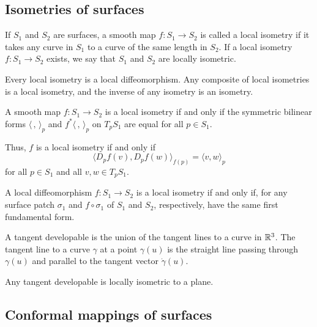 \subsection{Isometries of surfaces}

\begin{defn}
  If $S_1$ and $S_2$ are surfaces, a smooth map $f: S_1 \to S_2$ is called
  a local isometry if it takes any curve in $S_1$ to a curve of the same
  length in $S_2$.
  If a local isometry $f: S_1 \to S_2$ exists,
  we say that $S_1$ and $S_2$ are locally isometric.
\end{defn}

\begin{remark}
  Every local isometry is a local diffeomorphism.
  Any composite of local isometries is a local isometry, and
  the inverse of any isometry is an isometry.
\end{remark}

\begin{theorem}
  A smooth map $f: S_1 \to S_2$ is a local isometry if and only if
  the symmetric bilinear forms $\langle\,,\,\rangle_p$ and
  $f^*\langle\,,\,\rangle_p$ on $T_p S_1$ are equal for all $p \in S_1$.
\end{theorem}

Thus, $f$ is a local isometry if and only if
\[
  \langle D_p f(v), D_p f(w) \rangle_{f(p)} =
  \langle v, w \rangle_p
\]
for all $p \in S_1$ and all $v, w \in T_p S_1$.

\begin{corollary}
  A local diffeomorphism $f: S_1 \to S_2$ is a local isometry
  if and only if, for any surface patch $\sigma_1$ and
  $f \circ \sigma_1$ of $S_1$ and $S_2$, respectively,
  have the same first fundamental form.
\end{corollary}

\begin{defn}
  A tangent developable is the union of the tangent lines to a curve in
  $\mathbb{R}^3$.
  The tangent line to a curve $\gamma$ at a point $\gamma(u)$
  is the straight line passing through $\gamma(u)$ and parallel
  to the tangent vector $\dot{\gamma}(u)$.
\end{defn}

\begin{proposition}
  Any tangent developable is locally isometric to a plane.
\end{proposition}

\subsection{Conformal mappings of surfaces}

